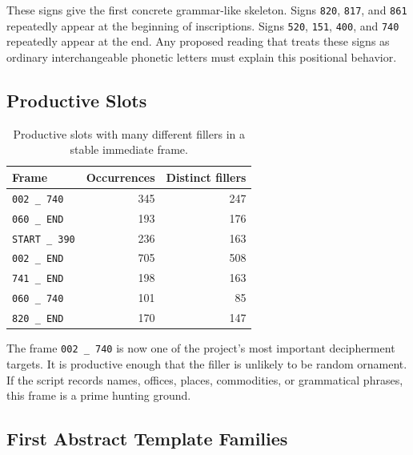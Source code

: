 These signs give the first concrete grammar-like skeleton. Signs \texttt{820}, \texttt{817}, and \texttt{861} repeatedly appear at the beginning of inscriptions. Signs \texttt{520}, \texttt{151}, \texttt{400}, and \texttt{740} repeatedly appear at the end. Any proposed reading that treats these signs as ordinary interchangeable phonetic letters must explain this positional behavior.

\subsection{Productive Slots}

\begin{table}[htbp]
\centering
\begin{tabular}{lrr}
\toprule
\textbf{Frame} & \textbf{Occurrences} & \textbf{Distinct fillers} \\
\midrule
\texttt{002 \_ 740} & 345 & 247 \\
\texttt{060 \_ END} & 193 & 176 \\
\texttt{START \_ 390} & 236 & 163 \\
\texttt{002 \_ END} & 705 & 508 \\
\texttt{741 \_ END} & 198 & 163 \\
\texttt{060 \_ 740} & 101 & 85 \\
\texttt{820 \_ END} & 170 & 147 \\
\bottomrule
\end{tabular}
\caption{Productive slots with many different fillers in a stable immediate frame.}
\label{tab:productive-slots}
\end{table}

The frame \texttt{002 \_ 740} is now one of the project’s most important decipherment targets. It is productive enough that the filler is unlikely to be random ornament. If the script records names, offices, places, commodities, or grammatical phrases, this frame is a prime hunting ground.

\subsection{First Abstract Template Families}

